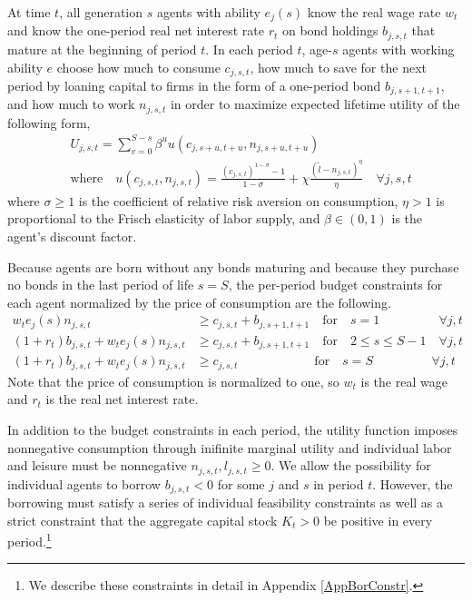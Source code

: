 \documentclass[letterpaper,12pt]{article}
\theoremstyle{definition}
\begin{document}
\begin{spacing}{1.5}
    At time $t$, all generation $s$ agents with ability $e_j(s)$ know the real wage rate $w_t$ and know the one-period real net interest rate $r_t$ on bond holdings $b_{j,s,t}$ that mature at the beginning of period $t$. In each period $t$, age-$s$ agents with working ability $e$ choose how much to consume $c_{j,s,t}$, how much to save for the next period by loaning capital to firms in the form of a one-period bond $b_{j,s+1,t+1}$, and how much to work $n_{j,s,t}$ in order to maximize expected lifetime utility of the following form,
    \begin{equation}\label{EqUtilMax}
      \begin{split}
        &U_{j,s,t} = \sum_{v=0}^{S-s}\beta^u u\left(c_{j,s+u,t+u},n_{j,s+u,t+u}\right) \\
        &\text{where} \quad u\left(c_{j,s,t},n_{j,s,t}\right) = \frac{\left(c_{j,s,t}\right)^{1-\sigma} - 1}{1-\sigma} + \chi\frac{(\tilde{l}-n_{j,s,t})^\eta}{\eta} \quad\forall j,s,t
      \end{split}
    \end{equation}
    where $\sigma\geq 1$ is the coefficient of relative risk aversion on consumption, $\eta>1$ is proportional to the Frisch elasticity of labor supply, and $\beta\in(0,1)$ is the agent's discount factor.

    Because agents are born without any bonds maturing and because they purchase no bonds in the last period of life $s=S$, the per-period budget constraints for each agent normalized by the price of consumption are the following.
    \begin{align}
      w_t e_j(s)n_{j,s,t} &\geq c_{j,s,t} + b_{j,s+1,t+1} \quad \text{for} \quad s = 1 \quad\quad\quad\quad\:\:\: \forall j,t \label{EqBC1} \\
      \left(1 + r_t\right) b_{j,s,t} + w_t e_j(s)n_{j,s,t} &\geq c_{j,s,t} + b_{j,s+1,t+1} \quad \text{for} \quad 2\leq s \leq S-1 \quad \forall j,t \label{EqBC2} \\
      \left(1 + r_t\right) b_{j,s,t} + w_t e_j(s)n_{j,s,t} &\geq c_{j,s,t} \quad\quad\quad\quad\quad\quad \text{for} \quad s = S \quad\quad\quad\quad\:\:\, \forall j,t \label{EqBC3}
    \end{align}
    Note that the price of consumption is normalized to one, so $w_t$ is the real wage and $r_t$ is the real net interest rate.

    In addition to the budget constraints in each period, the utility function imposes nonnegative consumption through inifinite marginal utility and individual labor and leisure must be nonnegative $n_{j,s,t},l_{j,s,t}\geq 0$. We allow the possibility for individual agents to borrow $b_{j,s,t}<0$ for some $j$ and $s$ in period $t$. However, the borrowing must satisfy a series of individual feasibility constraints as well as a strict constraint that the aggregate capital stock $K_t>0$ be positive in every period.\footnote{We describe these constraints in detail in Appendix \ref{AppBorConstr}.}


\end{spacing}
\end{document}
